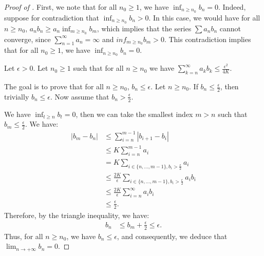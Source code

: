 \documentclass{article} %
\begin{document}
\begin{proof}[Proof of ]
First, we note that for all \( n_0 \geq 1 \), we have \( \inf_{n \geq n_0} b_n = 0 \). Indeed, suppose for contradiction that \( \inf_{n \geq n_0} b_n > 0 \). In this case, we would have for all $n \ge n_0$, \( a_n b_n \geq a_n \inf_{m \geq n_0} b_m \), which implies that the series \( \sum a_n b_n \) cannot converge, since \( \sum_{n=1}^{\infty} a_n=\infty \)  and $inf_{m \ge n_0} b_m>0$. This contradiction implies that for all \( n_0 \geq 1 \), we have \( \inf_{n \geq n_0} b_n = 0 \).


Let $\epsilon>0$. Let $n_0 \ge 1$  such that for all $n \ge n_0$ we have $\sum_{k=n}^{\infty} a_k b_k \le \frac{\epsilon^2}{4K}.$ 

The goal is to prove that for all \( n \geq n_0 \), \( b_n \leq \epsilon \). Let \( n \geq n_0 \). If \( b_n \leq \frac{\epsilon}{2} \), then trivially \( b_n \leq \epsilon \). Now assume that \( b_n > \frac{\epsilon}{2} \).

We have \( \inf_{t \geq n} b_t = 0 \), then we can take the smallest index \( m > n \) such that \( b_m \leq \frac{\epsilon}{2} \). We have: 
\begin{align*}
    |b_m-b_n| &\le \sum_{i=n}^{m-1} |b_{i+1}-b_i| \\
    &\le K \sum_{i=n}^{m-1} a_i \\
    &= K \sum_{i \in \{n,...,m-1\},b_i > \frac{\epsilon}{2}} a_i \\
    &\le \frac{2K}{\epsilon}\sum_{i \in \{n,...,m-1\},b_i > \frac{\epsilon}{2}} a_i b_i\\
    &\le \frac{2K}{\epsilon} \sum_{i=n}^{\infty} a_i b_i
    \\
    &\le \frac{\epsilon}{2}.
\end{align*}
Therefore, by the triangle inequality, we have:
\begin{align*}
b_n &\le b_m+\frac{\epsilon}{2} \le \epsilon.
\end{align*}
Thus, for all \( n \geq n_0 \), we have \( b_n \leq \epsilon \), and consequently, we deduce that \( \lim_{n \to +\infty} b_n = 0 \).




\end{proof}
\end{document}
